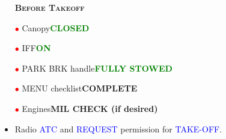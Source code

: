 \documentclass[a4paper,12pt,dvipsnames]{letter}
\newcommand{\radio}[1]{\textcolor{blue}{#1}}
\newcommand{\button}[1]{\textbf{#1}}
\newcommand{\ok}[1]{\textcolor{Green}{\textbf{#1}}}
\newcommand{\myHead}[1]{{\LARGE\textsc{\textbf{#1}}}}
\newcommand{\ri}{\textcolor{red}{$\bullet$\;}}
\begin{document}
{\begin{itemize}
\end{itemize}
\begin{itemize}
 \item[] \myHead{Before Takeoff}
 \item[\ri] Canopy\dotfill\ok{CLOSED}
 \item[\ri] IFF\dotfill\ok{ON}
 \item[\ri] PARK BRK handle\dotfill\ok{FULLY STOWED}
 \item[\ri] MENU checklist\dotfill\button{COMPLETE}
 \item[\ri] Engines\dotfill\button{MIL CHECK (if desired)}
  \item Radio \radio{ATC} and \radio{REQUEST} permission for \radio{TAKE-OFF}.
\end{itemize} 
%
}
\end{document}

